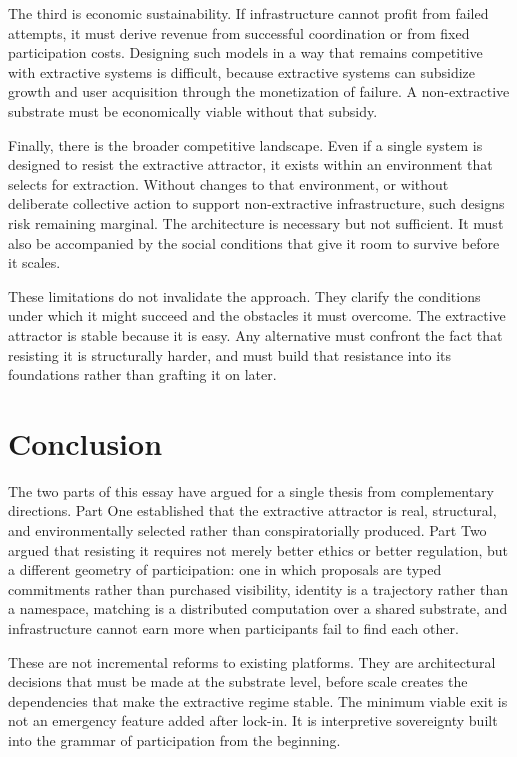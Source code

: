 \documentclass[12pt, a4paper]{article}
\begin{document}
The third is economic sustainability. If infrastructure cannot profit from
failed attempts, it must derive revenue from successful coordination or from
fixed participation costs. Designing such models in a way that remains
competitive with extractive systems is difficult, because extractive systems
can subsidize growth and user acquisition through the monetization of failure.
A non-extractive substrate must be economically viable without that subsidy.

Finally, there is the broader competitive landscape. Even if a single system
is designed to resist the extractive attractor, it exists within an
environment that selects for extraction. Without changes to that environment,
or without deliberate collective action to support non-extractive
infrastructure, such designs risk remaining marginal. The architecture
is necessary but not sufficient. It must also be accompanied by the social
conditions that give it room to survive before it scales.

These limitations do not invalidate the approach. They clarify the conditions
under which it might succeed and the obstacles it must overcome. The
extractive attractor is stable because it is easy. Any alternative must
confront the fact that resisting it is structurally harder, and must build
that resistance into its foundations rather than grafting it on later.

\section{Conclusion}

The two parts of this essay have argued for a single thesis from complementary
directions. Part One established that the extractive attractor is real,
structural, and environmentally selected rather than conspiratorially produced.
Part Two argued that resisting it requires not merely better ethics or better
regulation, but a different geometry of participation: one in which proposals
are typed commitments rather than purchased visibility, identity is a trajectory
rather than a namespace, matching is a distributed computation over a shared
substrate, and infrastructure cannot earn more when participants fail to find
each other.

These are not incremental reforms to existing platforms. They are architectural
decisions that must be made at the substrate level, before scale creates the
dependencies that make the extractive regime stable. The minimum viable exit is
not an emergency feature added after lock-in. It is interpretive sovereignty
built into the grammar of participation from the beginning.
\end{document}
